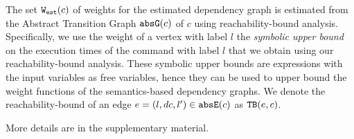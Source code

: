 The set $\mathtt{{W_{est}}}(c)$ of weights for the estimated dependency graph is estimated from 
the Abstract Transition Graph $\mathtt{abs}{\mathtt{G}}(c)$ of $c$ using reachability-bound analysis.
 Specifically, we use the weight of a vertex with label $l$ the \emph{symbolic upper bound} on the 
 execution times of the command with label $l$ that we obtain using our reachability-bound analysis. 
 These symbolic upper bounds are expressions with the input variables as free variables, 
 hence they can be used to upper bound the weight functions of the semantics-based dependency graphs.
We denote the reachability-bound of an edge $e = (l, dc, l') \in \mathtt{abs}{\mathtt{E}}(c)$ as ${\mathtt{TB}}(e, c)$.

More details are in the supplementary material.%
   
